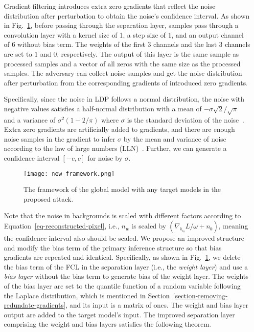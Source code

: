 \documentclass[lettersize,journal]{IEEEtran}
\begin{document}
Gradient filtering introduces extra zero gradients that reflect the noise distribution after perturbation to obtain the noise's confidence interval. As shown in Fig.~\ref{fig-attack-framework}, before passing through the separation layer, samples pass through a convolution layer with a kernel size of 1, a step size of 1, and an output channel of 6 without bias term. The weights of the first 3 channels and the last 3 channels are set to 1 and 0, respectively. The output of this layer is the same sample as processed samples and a vector of all zeros with the same size as the processed samples. The adversary can collect noise samples and get the noise distribution after perturbation from the corresponding gradients of introduced zero gradients.

Specifically, since the noise in LDP follows a normal distribution, the noise with negative values satisfies a half-normal distribution with a mean of $- \sigma \sqrt{2} / \sqrt{\pi}$ and a variance of $\sigma^2\left( 1 - 2/\pi\right)$ where $\sigma$ is the standard deviation of the noise~\cite{cooray2008generalization}. Extra zero gradients are artificially added to gradients, and there are enough noise samples in the gradient to infer $\sigma$ by the mean and variance of noise according to the law of large numbers (LLN)~\cite{dekking2005modern}. Further, we can generate a confidence interval $\left[-c, c\right]$ for noise by $\sigma$.

\begin{figure}
\centering
\texttt{[image: new\_framework.png]}
\caption{The framework of the global model with any target models in the proposed attack.}
\label{fig-attack-framework}
\end{figure}

Note that the noise in backgrounds is scaled with different factors according to Equation~\eqref{eq-reconstructed-pixel}, i.e., $n_w$ is scaled by $\left(\nabla_{b_{i_0}} L / \omega + n_b\right)$, meaning the confidence interval also should be scaled. We propose an improved structure and modify the bias term of the primary inference structure so that bias gradients are repeated and identical. Specifically, as shown in Fig.~\ref{fig-attack-framework}, we delete the bias term of the FCL in the separation layer (i.e., the \textit{weight layer}) and use a \textit{bias layer} without the bias term to generate bias of the weight layer. The weights of the bias layer are set to the quantile function of a random variable following the Laplace distribution, which is mentioned in Section~\ref{section-removing-redundate-gradients}, and its input is a matrix of ones. The weight and bias layer output are added to the target model's input. The improved separation layer comprising the weight and bias layers satisfies the following theorem.
\end{document}
